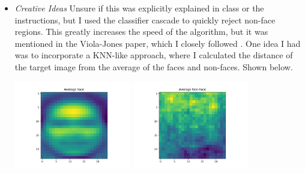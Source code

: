 \documentclass[11pt]{article}
\begin{document}
\begin{itemize}
        \item \textit{Creative Ideas}\newline
        Unsure if this was explicitly explained in class or the instructions, but I used the
        classifier cascade to quickly reject non-face regions. This greatly increases the speed
        of the algorithm, but it was mentioned in the Viola-Jones paper, which I closely followed
        . One idea I had was to incorporate a KNN-like approach, where I calculated the distance
        of the target image from the average of the faces and non-faces. Shown below.\newline
        \begin{center}
            \includegraphics[width=0.4\textwidth]{Output Pictures/average_test_face}
            \includegraphics[width=0.4\textwidth]{Output Pictures/average_test_non_face}
        \end{center}

    \end{itemize}
\end{document}
